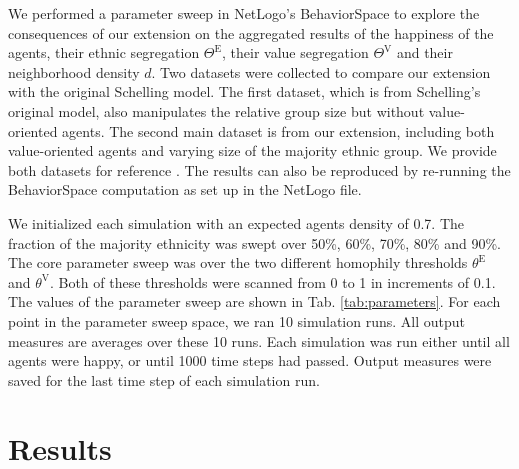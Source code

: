 \documentclass{ws-acs}
\begin{document}
{We performed a parameter sweep in NetLogo's BehaviorSpace to explore the consequences of our extension on the aggregated results of the happiness of the agents, their ethnic segregation $\Theta^\text{E}$, their value segregation $\Theta^\text{V}$ and their neighborhood density $d$. Two datasets were collected to compare our extension with the original Schelling model. The first dataset, which is from Schelling's original model, also manipulates the relative group size but without value-oriented agents. The second main dataset is from our extension, including both value-oriented agents and varying size of the majority ethnic group. We provide both datasets for reference \cite{PaolilloLorenz2018ValueSegregation}. The results can also be reproduced by re-running the BehaviorSpace computation as set up in the NetLogo file. 

We initialized each simulation with an expected agents density of 0.7. The fraction of the majority ethnicity was swept over 50\%, 60\%, 70\%, 80\% and 90\%. The core parameter sweep was over the two different homophily thresholds $\theta^\text{E}$ and $\theta^\text{V}$. Both of these thresholds were scanned from 0 to 1 in increments of 0.1. The values of the parameter sweep are shown in Tab. \ref{tab:parameters}. For each point in the parameter sweep space, we ran 10 simulation runs. All output measures are averages over these 10 runs. Each simulation was run either until all agents were happy, or until 1000 time steps had passed. Output measures were saved for the last time step of each simulation run. 



\section{Results}

}
\end{document}
